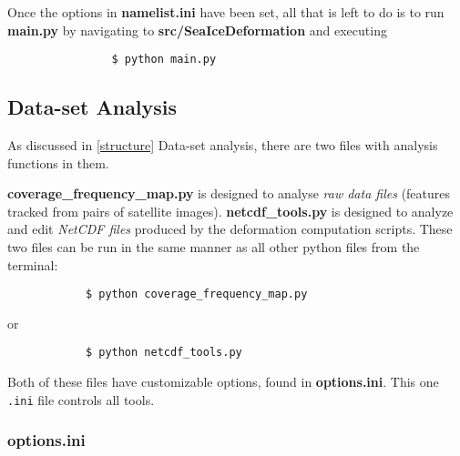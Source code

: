 \documentclass{article}
\begin{document}
            Once the options in \textbf{namelist.ini} have been set, all that is left to do is to run \textbf{main.py} by navigating to \textbf{src/SeaIceDeformation} and executing
            \begin{verbatim}
                $ python main.py
            \end{verbatim}

    \subsection{Data-set Analysis}

        As discussed in \ref{structure} Data-set analysis, there are two files with analysis functions in them.

        \textbf{coverage\_frequency\_map.py} is designed to analyse \textit{raw data files} (features tracked from pairs of satellite images). \textbf{netcdf\_tools.py} is designed to analyze and edit \textit{NetCDF files} produced by the deformation computation scripts. These two files can be run in the same manner as all other python files from the terminal:
        \begin{verbatim}
            $ python coverage_frequency_map.py
        \end{verbatim}
        or
        \begin{verbatim}
            $ python netcdf_tools.py
        \end{verbatim}
        Both of these files have customizable options, found in \textbf{options.ini}. This one \verb?.ini? file controls all tools.

        \subsubsection{\textbf{options.ini}}
\end{document}
